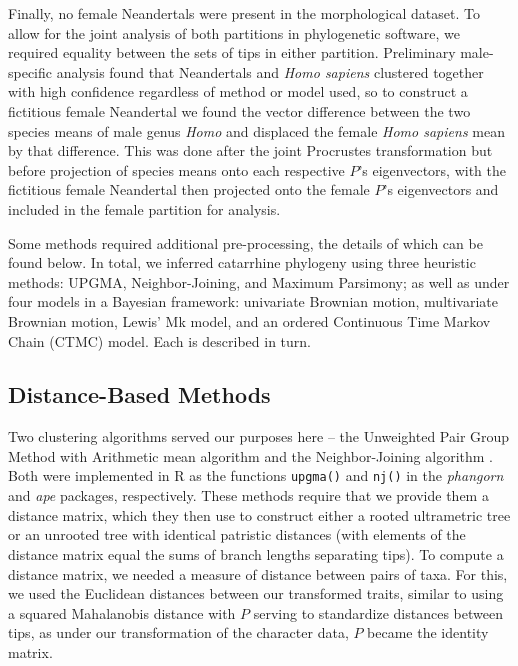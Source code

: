 Finally, no female Neandertals were present in the morphological dataset. To allow for the joint analysis of both partitions in phylogenetic software, we required equality between the sets of tips in either partition. Preliminary male-specific analysis found that Neandertals and \textit{Homo sapiens} clustered together with high confidence regardless of method or model used, so to construct a fictitious female Neandertal we found the vector difference between the two species means of male genus \textit{Homo} and displaced the female \textit{Homo sapiens} mean by that difference. This was done after the joint Procrustes transformation but before projection of species means onto each respective $P$'s eigenvectors, with the fictitious female Neandertal then projected onto the female $P$'s eigenvectors and included in the female partition for analysis.

Some methods required additional pre-processing, the details of which can be found below. In total, we inferred catarrhine phylogeny using three heuristic methods: UPGMA, Neighbor-Joining, and Maximum Parsimony; as well as under four models in a Bayesian framework: univariate Brownian motion, multivariate Brownian motion, Lewis' Mk model, and an ordered Continuous Time Markov Chain (CTMC) model. Each is described in turn. 

\subsection{Distance-Based Methods}

Two clustering algorithms served our purposes here -- the Unweighted Pair Group Method with Arithmetic mean algorithm \citep{sokalStatisticalMethodEvaluating1958} and the Neighbor-Joining algorithm \citep{saitouNeighborjoiningMethodNew1987}. Both were implemented in R as the functions \texttt{upgma()} and \texttt{nj()} in the \textit{phangorn} \citep{schliepPhangornPhylogeneticAnalysis2011} and \textit{ape} \citep{paradisAPEAnalysesPhylogenetics2004} packages, respectively. These methods require that we provide them a distance matrix, which they then use to construct either a rooted ultrametric tree or an unrooted tree with identical patristic distances (with elements of the distance matrix equal the sums of branch lengths separating tips). To compute a distance matrix, we needed a measure of distance between pairs of taxa. For this, we used the Euclidean distances between our transformed traits, similar to using a squared Mahalanobis distance \citep{mahalanobisGeneralizedDistanceStatistics1936} with $P$ serving to standardize distances between tips, as under our transformation of the character data, $P$ became the identity matrix. 

